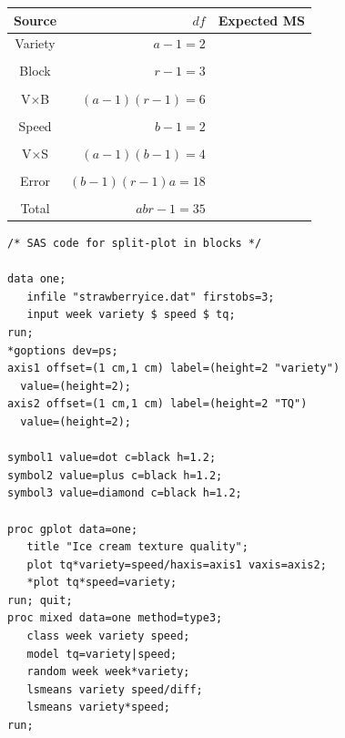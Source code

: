 \begin{center}
\begin{tabular}{c|r|c}
Source & $df$ & Expected MS \\ \hline
Variety & $a-1=2$ & \\ &&\\
Block & $r-1=3$ & \\ &&\\
V$\times$B  & $(a-1)(r-1)=6$ & \\  &&\\\hline
Speed & $b-1=2$ & \\ &&\\
V$\times$S & $(a-1)(b-1)=4$ & \\ &&\\
Error  & $(b-1)(r-1)a=18$ & \\  &&\\
Total & $abr-1=35$ \\ \hline
\end{tabular}
\end{center}
\newpage
\begin{verbatim}
/* SAS code for split-plot in blocks */

data one;
   infile "strawberryice.dat" firstobs=3;
   input week variety $ speed $ tq;
run;
*goptions dev=ps;
axis1 offset=(1 cm,1 cm) label=(height=2 "variety") 
  value=(height=2);
axis2 offset=(1 cm,1 cm) label=(height=2 "TQ") 
  value=(height=2);

symbol1 value=dot c=black h=1.2;
symbol2 value=plus c=black h=1.2;
symbol3 value=diamond c=black h=1.2;

proc gplot data=one;
   title "Ice cream texture quality";
   plot tq*variety=speed/haxis=axis1 vaxis=axis2;
   *plot tq*speed=variety;
run; quit;
proc mixed data=one method=type3;
   class week variety speed;
   model tq=variety|speed; 
   random week week*variety;
   lsmeans variety speed/diff;
   lsmeans variety*speed;
run;
\end{verbatim}
\newpage

